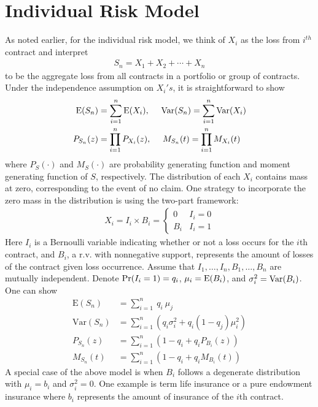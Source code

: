 \documentclass[12pt,letterpaper]{article}
\begin{document}
\section{Individual Risk Model}

As noted earlier, for the individual risk model, we think of $X_i$ as the loss from $i^{th}$ contract and interpret
\begin{eqnarray*}
S_n=X_1 +X_2 +\cdots+X_n
\end{eqnarray*}
to be the aggregate loss from all contracts in a portfolio or group of contracts. Under the independence assumption on $X_i's$, it is straightforward to show
 \begin{align*}
    {\rm E}(S_n) &= \sum_{i=1}^{n} {\rm E}(X_i),~~~~
    {\rm Var}(S_n) = \sum_{i=1}^{n} {\rm Var}(X_i)\\
    P_{S_n}(z) &= \prod_{i=1}^{n}P_{X_i}(z), ~~~~
    M_{S_n}(t) = \prod_{i=1}^{n}M_{X_i}(t) \\
 \end{align*}
where $P_S(\cdot)$ and $M_S(\cdot)$ are probability generating function and moment generating function of $S$, respectively. The distribution of each $X_i$ contains mass at zero, corresponding to the event of no claim. One strategy to incorporate the zero mass in the distribution is using the two-part framework:
\begin{align*}
X_i = I_i\times B_i = \left\{\begin{array}{ll}
                               0 & I_i=0 \\
                               B_i & I_i=1
                             \end{array}
             \right.
\end{align*}
Here $I_i$ is a Bernoulli variable indicating whether or not a loss occurs for the $i$th contract, and $B_i$, a r.v. with nonnegative support, represents the amount of losses of the contract given loss occurrence. Assume that $I_1 ,\ldots,I_n ,B_1 ,\ldots,B_n$ are mutually independent. Denote ${\rm Pr} (I_i =1)=q_i$, $\mu_i={\rm E}(B_i)$, and $\sigma_i^2={\rm Var}(B_i)$. One can show
\begin{align*}
\mathrm{E}(S_n)& =\sum_{i=1}^n ~q_i  ~\mu _j \\
\mathrm{Var}(S_n) & =\sum_{i=1}^n \left( q_i \sigma _i^2+q_i (1-q_j)\mu_i^2 \right)\\
P_{S_n}(z) & =\sum_{i=1}^n \left( 1-q_i+q_i P_{B_i}(z) \right)\\
M_{S_n}(t) & =\sum_{i=1}^n \left( 1-q_i+q_i M_{B_i}(t) \right)
\end{align*}
A special case of the above model is when $B_i$ follows a degenerate distribution with $\mu_i=b_i$ and $\sigma^2_i=0$. One example is term life insurance or a pure endowment insurance where $b_i$ represents the amount of insurance of the $i$th contract.
\end{document}
